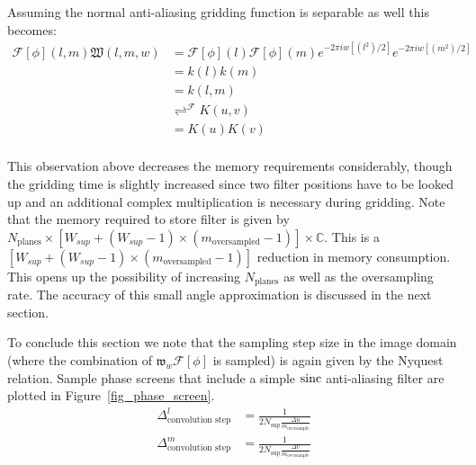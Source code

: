 Assuming the normal anti-aliasing gridding function is separable as well this becomes:
\begin{equation}
   \begin{split}
   \mathcal{F}[\phi](l,m)\mathfrak{W}(l,m,w) &= \mathcal{F}[\phi](l)\mathcal{F}[\phi](m)e^{-2{\pi}iw[(l^2)/2]}e^{-2{\pi}iw[(m^2)/2]}\\
                             &= k(l)k(m)\\
                             &= k(l,m)\\
                             &\rightleftharpoons^\mathcal{F} K(u,v)\\
                             &=K(u)K(v)\\
   \end{split}
\end{equation}

This observation above decreases the memory requirements considerably, though the gridding time is slightly increased since two filter positions have to be looked up
and an additional complex multiplication is necessary during gridding. Note that the memory required to store filter is given by 
$N_{\text{planes}}\times[W_{sup} + (W_{sup} - 1)\times(m_{\text{oversampled}} - 1)]\times\mathbb{C}$. This is 
a $[W_{sup} + (W_{sup} - 1)\times(m_{\text{oversampled}} - 1)]$ reduction in memory consumption. This opens up the possibility of increasing $N_{\text{planes}}$ as well
as the oversampling rate. The accuracy of this small angle approximation is discussed in the next section.

To conclude this section we note that the sampling step size in the image domain (where the combination of $\mathfrak{w}_w\mathcal{F}[\phi]$ is sampled) is again given
by the Nyquest relation. Sample phase screens that include a simple $\operatorname*{sinc}$ anti-aliasing filter are plotted in Figure~\ref{fig_phase_screen}.
\begin{equation}
 \begin{split}
  \Delta^l_{\text{convolution step}}&=\frac{1}{2N_{\text{sup}}\frac{\Delta{u}}{m_{\text{oversample}}}}\\
  \Delta^m_{\text{convolution step}}&=\frac{1}{2N_{\text{sup}}\frac{\Delta{v}}{m_{\text{oversample}}}}\\
 \end{split}
\end{equation}

